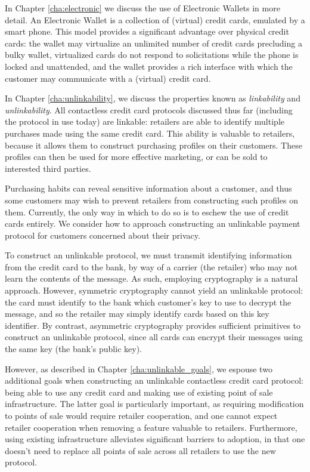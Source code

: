 
In Chapter \ref{cha:electronic} we discuss the use of Electronic Wallets in more detail.
An Electronic Wallet is a collection of (virtual) credit cards, emulated by a smart phone.
This model provides a significant advantage over physical credit cards:
    the wallet may virtualize an unlimited number of credit cards precluding a bulky wallet,
    virtualized cards do not respond to solicitations while the phone is locked and unattended,
    and the wallet provides a rich interface with which the customer may communicate with a (virtual) credit card.


In Chapter \ref{cha:unlinkability}, we discuss the properties known as \emph{linkability} and \emph{unlinkability}.
All contactless credit card protocols discussed thus far (including the protocol in use today) are linkable:
    retailers are able to identify multiple purchases made using the same credit card.
This ability is valuable to retailers, because it allows them to construct purchasing profiles on their customers.
These profiles can then be used for more effective marketing, or can be sold to interested third parties.

Purchasing habits can reveal sensitive information about a customer,
    and thus some customers may wish to prevent retailers from constructing such profiles on them.
Currently, the only way in which to do so is to eschew the use of credit cards entirely.
We consider how to approach constructing an unlinkable payment protocol for customers concerned about their privacy.

To construct an unlinkable protocol, we must transmit identifying information from the credit card to the bank,
    by way of a carrier (the retailer) who may not learn the contents of the message.
As such, employing cryptography is a natural approach.
However, symmetric cryptography cannot yield an unlinkable protocol:
    the card must identify to the bank which customer's key to use to decrypt the message, and so the retailer may simply identify cards based on this key identifier.
By contrast, asymmetric cryptography provides sufficient primitives to construct an unlinkable protocol, since all cards can encrypt their messages using the same key (the bank's public key).


However, as described in Chapter \ref{cha:unlinkable_goals}, we espouse two additional goals when constructing an unlinkable contactless credit card protocol:
    being able to use any credit card and making use of existing point of sale infrastructure.
The latter goal is particularly important, as requiring modification to points of sale would require retailer cooperation,
    and one cannot expect retailer cooperation when removing a feature valuable to retailers.
Furthermore, using existing infrastructure alleviates significant barriers to adoption, in that one doesn't need to replace all points of sale across all retailers to use the new protocol.

